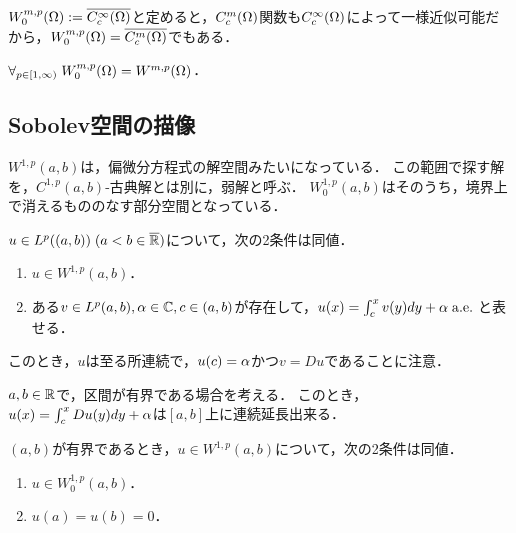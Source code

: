\documentclass[uplatex,dvipdfmx]{jsreport}
\begin{document}
\begin{definition}
    $W^{m,p}_0(\Omega):=\overline{C^\infty_c(\Omega)}$と定めると，$C^m_c(\Omega)$関数も$C^\infty_c(\Omega)$によって一様近似可能だから，$W^{m,p}_0(\Omega)=\overline{C^m_c(\Omega)}$でもある．
\end{definition}

\begin{theorem}
    $\forall_{p\in[1,\infty)}\;W_0^{m,p}(\Omega)=W^{m,p}(\Omega)$．
\end{theorem}

\subsection{Sobolev空間の描像}

\begin{tcolorbox}[colframe=ForestGreen, colback=ForestGreen!10!white,breakable,colbacktitle=ForestGreen!40!white,coltitle=black,fonttitle=\bfseries\sffamily,
title=]
    $W^{1,p}(a,b)$は，偏微分方程式の解空間みたいになっている．
    この範囲で探す解を，$C^{1,p}(a,b)$-古典解とは別に，弱解と呼ぶ．
    $W^{1,p}_0(a,b)$はそのうち，境界上で消えるもののなす部分空間となっている．
\end{tcolorbox}

\begin{theorem}
    $u\in L^p((a,b))\;(a<b\in\overline{\mathbb{R}})$について，次の2条件は同値．
    \begin{enumerate}
        \item $u\in W^{1,p}(a,b)$．
        \item ある$v\in L^p(a,b),\alpha\in\mathbb{C},c\in(a,b)$が存在して，$u(x)=\int^x_cv(y)dy+\alpha\;\mathrm{a.e.}\;$と表せる．
    \end{enumerate}
    このとき，$u$は至る所連続で，$u(c)=\alpha$かつ$v=Du$であることに注意．
\end{theorem}

\begin{definition}
    $a,b\in\mathbb{R}$で，区間が有界である場合を考える．
    このとき，$u(x)=\int^x_cDu(y)dy+\alpha$は$[a,b]$上に連続延長出来る．
\end{definition}

\begin{theorem}
    $(a,b)$が有界であるとき，$u\in W^{1,p}(a,b)$について，次の2条件は同値．
    \begin{enumerate}
        \item $u\in W^{1,p}_0(a,b)$．
        \item $u(a)=u(b)=0$．
    \end{enumerate}
\end{theorem}
\end{document}
